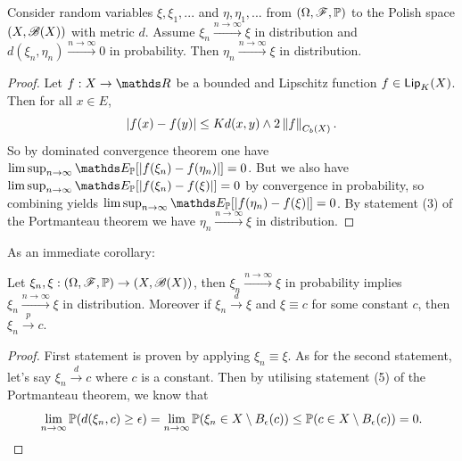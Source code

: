 \begin{theorem}[Slutsky]
Consider random variables $\xi, \xi_1,...$ and $\eta,\eta_1,...$ from $(\Omega,\mathcal{F},\mathbb{P})$ to the Polish space $(X,\mathcal{B}(X))$ with metric $d$. Assume $\xi_n \overset{n\to\infty}{\to} \xi$ in distribution and $d(\xi_n, \eta_n) \overset{n\to\infty}{\to} 0$ in probability. Then $\eta_n \overset{n\to\infty}{\to} \xi$ in distribution.
\end{theorem}

\begin{proof}
Let $f:X \to \R$ be a bounded and Lipschitz function $f \in \mathsf{Lip}_{K}(X)$. Then for all $x \in E$,
\begin{equation}
    \left| f(x) - f(y) \right| \leq Kd(x,y) \wedge 2\left\| f \right\|_{C_b(X)}.
\end{equation}
So by dominated convergence theorem one have $\limsup_{n\to\infty} \E_{\p}[|f(\xi_n) - f(\eta_n)|] = 0$. But we also have $\limsup_{n\to\infty} \E_{\p}[|f(\xi_n) - f(\xi)|] = 0$ by convergence in probability, so combining yields $\limsup_{n\to\infty} \E_{\p}[|f(\eta_n) - f(\xi)|] = 0$. By statement (3) of the Portmanteau theorem we have $\eta_n \overset{n\to\infty}{\to} \xi$ in distribution.
\end{proof}

As an immediate corollary:
\begin{corollary} \label{cor:prob_implies_dist}
Let $\xi_n, \xi: (\Omega,\mathcal{F},\mathbb{P}) \to (X,\mathcal{B}(X))$, then $\xi_n \overset{n\to\infty}{\to} \xi$ in probability implies $\xi_n \overset{n\to\infty}{\to} \xi$ in distribution. Moreover if $\xi_n \overset{d}{\to} \xi$ and $\xi \equiv c$ for some constant $c$, then $\xi_n \overset{p}{\to} c$.
\begin{figure} [H]
    \centering
\end{figure}
\end{corollary}

\begin{proof} 
First statement is proven by applying $\xi_n \equiv \xi$. As for the second statement, let's say $\xi_n \overset{d}{\to} c$ where $c$ is a constant. Then by utilising statement (5) of the Portmanteau theorem, we know that
\begin{equation*}
    \lim_{n\to \infty} \mathbb{P}(d(\xi_n, c) \geq \epsilon) = \lim_{n\to \infty} \mathbb{P}(\xi_n \in X \setminus B_\epsilon(c)) \leq \mathbb{P}(c \in X \setminus B_\epsilon(c)) = 0.
\end{equation*}
\end{proof}

